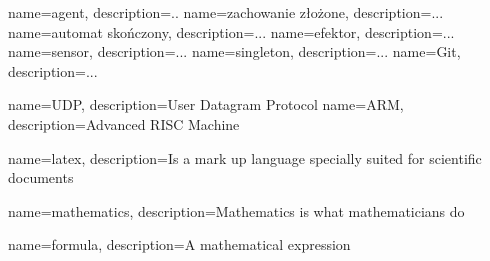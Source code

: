  {name=agent, description={..}}
 {name=zachowanie złożone, description={...}}
 {name=automat skończony, description={...}}
 {name=efektor, description={...}}
 {name=sensor, description={...}}
 {name=singleton, description={...}}
 {name=Git, description={...}}

 {name=UDP, description={User Datagram Protocol}}
 {name=ARM, description={Advanced RISC Machine}}


{
    name=latex,
    description={Is a mark up language specially suited for scientific documents}
}

{
    name=mathematics,
    description={Mathematics is what mathematicians do}
}

{
    name=formula,
    description={A mathematical expression}
}



